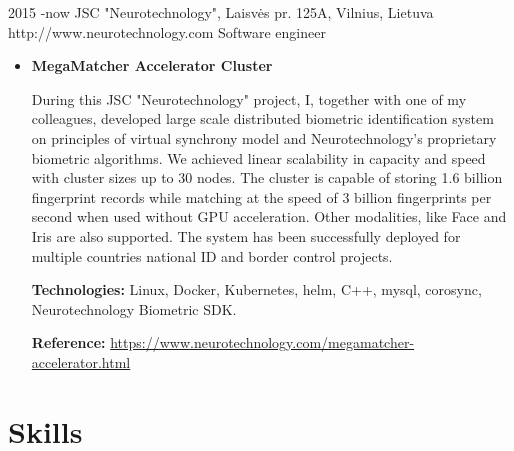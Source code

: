 \documentclass[12]{article}
\begin{document}
\job
{2015 -}{now}
{JSC "Neurotechnology", Laisvės pr. 125A, Vilnius, Lietuva}
{http://www.neurotechnology.com}
{Software engineer}
{}

\begin{itemize}[leftmargin=2cm,topsep=-0.5cm]
\item \textbf{MegaMatcher Accelerator Cluster}

During this JSC "Neurotechnology" project, I, together with one of my  colleagues, developed large scale distributed biometric identification system on principles of virtual synchrony model and Neurotechnology's proprietary biometric algorithms.
We achieved linear scalability in capacity and speed with cluster sizes up to 30 nodes.
The cluster is capable of storing 1.6 billion fingerprint records while matching at the speed of 3 billion fingerprints per second when used without GPU acceleration.
Other modalities, like Face and Iris are also supported.
The system has been successfully deployed for multiple countries national ID and border control projects.

\rule{0mm}{5mm}\textbf{Technologies:} Linux, Docker, Kubernetes, helm, C++, mysql, corosync, Neurotechnology Biometric SDK.

\rule{0mm}{5mm}\textbf{Reference:} \url{https://www.neurotechnology.com/megamatcher-accelerator.html}

\end{itemize}

\section{Skills}
\end{document}
